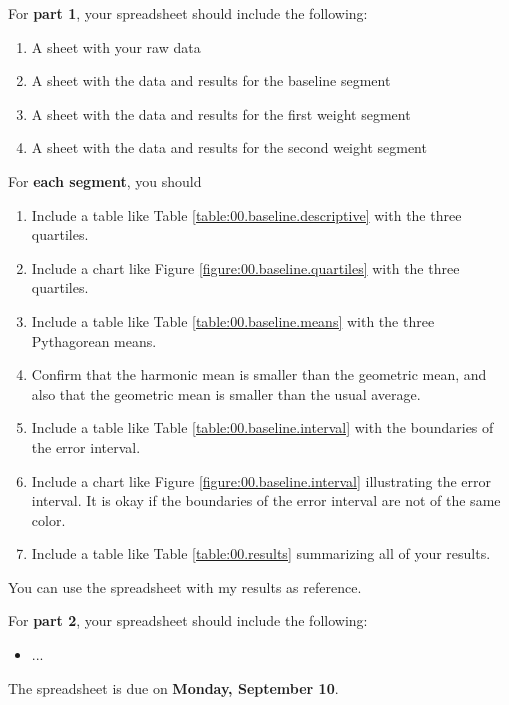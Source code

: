 For \textbf{part 1}, your spreadsheet should include the following:
\begin{enumerate}
    \item A sheet with your raw data
    \item A sheet with the data and results for the baseline segment
    \item A sheet with the data and results for the first weight segment
    \item A sheet with the data and results for the second weight segment
\end{enumerate}
For \textbf{each segment}, you should
\begin{enumerate}
    \item Include a table like Table \ref{table:00.baseline.descriptive} with the three quartiles.
    \item Include a chart like Figure \ref{figure:00.baseline.quartiles} with the three quartiles.
    \item Include a table like Table \ref{table:00.baseline.means} with the three Pythagorean means.
    \item Confirm that the harmonic mean is smaller than the geometric mean, and also that the geometric mean is smaller than the usual average.
    \item Include a table like Table \ref{table:00.baseline.interval} with the boundaries of the error interval.
    \item Include a chart like Figure \ref{figure:00.baseline.interval} illustrating the error interval. It is okay if the boundaries of the error interval are not of the same color.
    \item Include a table like Table \ref{table:00.results} summarizing all of your results.
\end{enumerate}
You can use the spreadsheet with my results as reference.

For \textbf{part 2}, your spreadsheet should include the following:
\begin{itemize}
    \item ...
\end{itemize}
The spreadsheet is due on \textbf{Monday, September 10}.